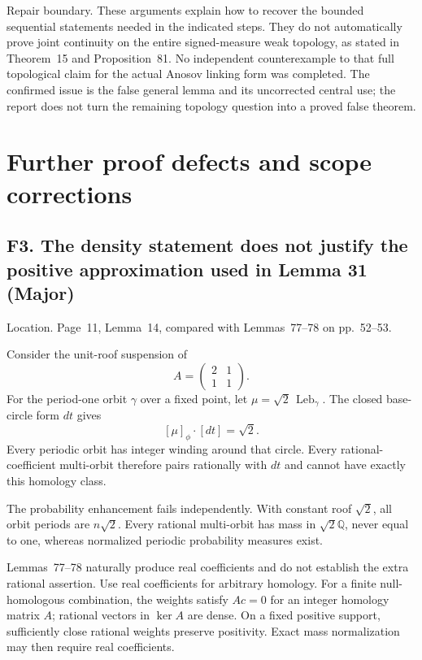 \documentclass[10pt]{article}
\begin{document}
Repair boundary. These arguments explain how to recover the bounded sequential statements needed in the indicated steps. They do not automatically prove joint continuity on the entire signed-measure weak topology, as stated in Theorem 15 and Proposition 81. No independent counterexample to that full topological claim for the actual Anosov linking form was completed. The confirmed issue is the false general lemma and its uncorrected central use; the report does not turn the remaining topology question into a proved false theorem.\par
\section*{Further proof defects and scope corrections}
\subsection*{F3. The density statement does not justify the positive approximation used in Lemma 31 (Major)}
Location. Page 11, Lemma 14, compared with Lemmas 77–78 on pp. 52–53.\par
Consider the unit-roof suspension of \[A=\begin{pmatrix}2&1\\1&1\end{pmatrix}.\] For the period-one orbit \(\gamma\) over a fixed point, let \(\mu=\sqrt2\,\operatorname{Leb}_\gamma\). The closed base-circle form \(dt\) gives \[[\mu]_\phi\cdot[dt]=\sqrt2.\] Every periodic orbit has integer winding around that circle. Every rational-coefficient multi-orbit therefore pairs rationally with \(dt\) and cannot have exactly this homology class.\par
The probability enhancement fails independently. With constant roof \(\sqrt2\), all orbit periods are \(n\sqrt2\). Every rational multi-orbit has mass in \(\sqrt2\mathbb Q\), never equal to one, whereas normalized periodic probability measures exist.\par
Lemmas 77–78 naturally produce real coefficients and do not establish the extra rational assertion. Use real coefficients for arbitrary homology. For a finite null-homologous combination, the weights satisfy \(Ac=0\) for an integer homology matrix \(A\); rational vectors in \(\ker A\) are dense. On a fixed positive support, sufficiently close rational weights preserve positivity. Exact mass normalization may then require real coefficients.\par
\end{document}
